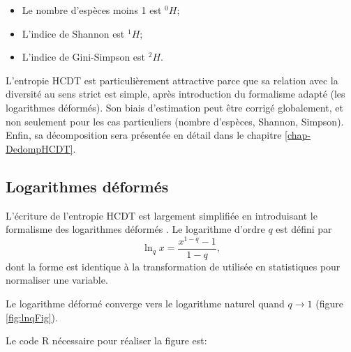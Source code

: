 \documentclass[
  11pt,
  french,
  a4paper,
  extrafontsizes,onecolumn,openright
  ]{memoir}
\providecommand{\tightlist}{%
  \setlength{\itemsep}{0pt}\setlength{\parskip}{0pt}}
\begin{document}
\begin{itemize}
\tightlist
\item
  Le nombre d'espèces moins 1 est \(^{0}\!H\);
\item
  L'indice de Shannon est \(^{1}\!H\);
\item
  L'indice de Gini-Simpson est \(^{2}\!H\).
\end{itemize}

L'entropie HCDT est particulièrement attractive parce que sa relation avec la diversité au sens strict est simple, après introduction du formalisme adapté (les logarithmes déformés).
Son biais d'estimation peut être corrigé globalement, et non seulement pour les cas particuliers (nombre d'espèces, Shannon, Simpson).
Enfin, sa décomposition sera présentée en détail dans le chapitre \ref{chap-DedompHCDT}.

\subsection{Logarithmes déformés}\label{logarithmes-duxe9formuxe9s}

L'écriture de l'entropie HCDT est largement simplifiée en introduisant le formalisme des logarithmes déformés \autocite{Tsallis1994}.
Le logarithme d'ordre \(q\) est défini par
\begin{equation}
  \label{eq:lnq}
  \ln_q{x} = \frac{x^{1-q}-1}{1-q},
\end{equation}
dont la forme est identique à la transformation de \textcite{Box1964} utilisée en statistiques pour normaliser une variable.

Le logarithme déformé converge vers le logarithme naturel quand \(q\to 1\) (figure \ref{fig:lnqFig}).

Le code R nécessaire pour réaliser la figure est:

\scriptsize
\end{document}
